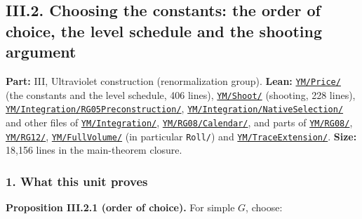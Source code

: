 \documentclass[
  letterpaper,
  11pt]{article}
\begin{document}
\subsection{III.2. Choosing the constants: the order of choice, the
level schedule and the shooting
argument}\label{iii.2.-choosing-the-constants-the-order-of-choice-the-level-schedule-and-the-shooting-argument}

\textbf{Part:} III, Ultraviolet construction (renormalization group).
\textbf{Lean:}
\href{https://github.com/yang-mills-group/OpenAI-YM-20261028/tree/3456e5e75cf8d4cd558955a5c7638fba2d68f464/YM/Price}{\texttt{YM/Price/}}
(the constants and the level schedule, 406 lines),
\href{https://github.com/yang-mills-group/OpenAI-YM-20261028/tree/3456e5e75cf8d4cd558955a5c7638fba2d68f464/YM/Shoot}{\texttt{YM/Shoot/}}
(shooting, 228 lines),
\href{https://github.com/yang-mills-group/OpenAI-YM-20261028/tree/3456e5e75cf8d4cd558955a5c7638fba2d68f464/YM/Integration/RG05Preconstruction}{\texttt{YM/Integration/RG05Preconstruction/}},
\href{https://github.com/yang-mills-group/OpenAI-YM-20261028/tree/3456e5e75cf8d4cd558955a5c7638fba2d68f464/YM/Integration/NativeSelection}{\texttt{YM/Integration/NativeSelection/}}
and other files of
\href{https://github.com/yang-mills-group/OpenAI-YM-20261028/tree/3456e5e75cf8d4cd558955a5c7638fba2d68f464/YM/Integration}{\texttt{YM/Integration/}},
\href{https://github.com/yang-mills-group/OpenAI-YM-20261028/tree/3456e5e75cf8d4cd558955a5c7638fba2d68f464/YM/RG08/Calendar}{\texttt{YM/RG08/Calendar/}},
and parts of
\href{https://github.com/yang-mills-group/OpenAI-YM-20261028/tree/3456e5e75cf8d4cd558955a5c7638fba2d68f464/YM/RG08}{\texttt{YM/RG08/}},
\href{https://github.com/yang-mills-group/OpenAI-YM-20261028/tree/3456e5e75cf8d4cd558955a5c7638fba2d68f464/YM/RG12}{\texttt{YM/RG12/}},
\href{https://github.com/yang-mills-group/OpenAI-YM-20261028/tree/3456e5e75cf8d4cd558955a5c7638fba2d68f464/YM/FullVolume}{\texttt{YM/FullVolume/}}
(in particular \texttt{Roll/}) and
\href{https://github.com/yang-mills-group/OpenAI-YM-20261028/tree/3456e5e75cf8d4cd558955a5c7638fba2d68f464/YM/TraceExtension}{\texttt{YM/TraceExtension/}}.
\textbf{Size:} 18,156 lines in the main-theorem closure.

\subsubsection{1. What this unit proves}\label{what-this-unit-proves-4}

\textbf{Proposition III.2.1 (order of choice).} For simple \(G\),
choose:
\end{document}

